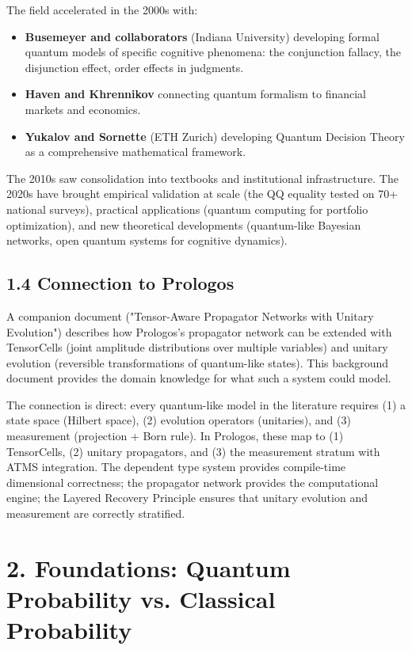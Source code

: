 \documentclass[11pt]{article}
\begin{document}
The field accelerated in the 2000s with:
\begin{itemize}
\item \textbf{Busemeyer and collaborators} (Indiana University) developing formal quantum
models of specific cognitive phenomena: the conjunction fallacy, the disjunction
effect, order effects in judgments.
\item \textbf{Haven and Khrennikov} connecting quantum formalism to financial markets and
economics.
\item \textbf{Yukalov and Sornette} (ETH Zurich) developing Quantum Decision Theory as a
comprehensive mathematical framework.
\end{itemize}

The 2010s saw consolidation into textbooks and institutional infrastructure.
The 2020s have brought empirical validation at scale (the QQ equality tested on
70+ national surveys), practical applications (quantum computing for portfolio
optimization), and new theoretical developments (quantum-like Bayesian networks,
open quantum systems for cognitive dynamics).
\subsection{1.4 Connection to Prologos}
\label{sec:orgd574b2f}

A companion document ("Tensor-Aware Propagator Networks with Unitary Evolution")
describes how Prologos's propagator network can be extended with TensorCells
(joint amplitude distributions over multiple variables) and unitary evolution
(reversible transformations of quantum-like states). This background document
provides the domain knowledge for what such a system could model.

The connection is direct: every quantum-like model in the literature requires
(1) a state space (Hilbert space), (2) evolution operators (unitaries), and
(3) measurement (projection + Born rule). In Prologos, these map to
(1) TensorCells, (2) unitary propagators, and (3) the measurement stratum with
ATMS integration. The dependent type system provides compile-time dimensional
correctness; the propagator network provides the computational engine; the
Layered Recovery Principle ensures that unitary evolution and measurement are
correctly stratified.
\section{2. Foundations: Quantum Probability vs. Classical Probability}
\label{sec:org49de79e}
\end{document}
